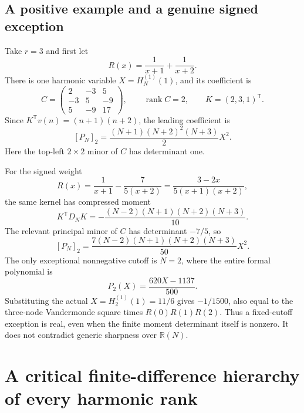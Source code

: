 \documentclass[11pt]{article}
\theoremstyle{definition}
\theoremstyle{remark}
\numberwithin{equation}{section}
\begin{document}
\subsection{A positive example and a genuine signed exception}

Take $r=3$ and first let
\[
 R(x)=\frac1{x+1}+\frac1{x+2}.
\]
There is one harmonic variable $X=H_N^{(1)}(1)$, and its coefficient is
\[
 C=\begin{pmatrix}2&-3&5\\-3&5&-9\\5&-9&17\end{pmatrix},
 \qquad \operatorname{rank}C=2,
 \qquad K=(2,3,1)^{\mathsf T}.
\]
Since $K^{\mathsf T}v(n)=(n+1)(n+2)$, the leading coefficient is
\begin{equation}\label{deg:positive-example}
 [P_N]_2=\frac{(N+1)(N+2)^2(N+3)}2 X^2.
\end{equation}
Here the top-left $2\times2$ minor of $C$ has determinant one.

For the signed weight
\begin{equation}\label{deg:signed-weight}
 R(x)=\frac1{x+1}-\frac7{5(x+2)}
     =\frac{3-2x}{5(x+1)(x+2)},
\end{equation}
the same kernel has compressed moment
\[
 K^{\mathsf T}D_NK
 =-\frac{(N-2)(N+1)(N+2)(N+3)}{10}.
\]
The relevant principal minor of $C$ has determinant $-7/5$, so
\begin{equation}\label{deg:signed-leading}
 [P_N]_2=\frac{7(N-2)(N+1)(N+2)(N+3)}{50}X^2.
\end{equation}
The only exceptional nonnegative cutoff is $N=2$, where the entire
formal polynomial is
\begin{equation}\label{deg:signed-exception}
 P_2(X)=\frac{620X-1137}{500}.
\end{equation}
Substituting the actual $X=H_2^{(1)}(1)=11/6$ gives $-1/1500$, also
equal to the three-node Vandermonde square times
$R(0)R(1)R(2)$.  Thus a fixed-cutoff exception is real, even when the
finite moment determinant itself is nonzero.  It does not contradict
generic sharpness over $\mathbb R(N)$.


\section{A critical finite-difference hierarchy of every harmonic rank}
\label{hier:sec}
\end{document}
